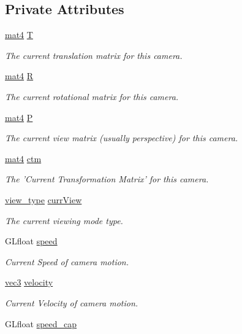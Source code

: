 \subsection*{\-Private \-Attributes}
\begin{DoxyCompactItemize}
\item 
\hyperlink{class_angel_1_1mat4}{mat4} \hyperlink{class_camera_aa4cb92b539c9a9707a12d7025ed889f6}{\-T}
\begin{DoxyCompactList}\small\item\em \-The current translation matrix for this camera. \end{DoxyCompactList}\item 
\hyperlink{class_angel_1_1mat4}{mat4} \hyperlink{class_camera_a8fd028120b18556c43ad86756e637fbc}{\-R}
\begin{DoxyCompactList}\small\item\em \-The current rotational matrix for this camera. \end{DoxyCompactList}\item 
\hyperlink{class_angel_1_1mat4}{mat4} \hyperlink{class_camera_a0bee6fbae6ec5960850a5fb858f3912a}{\-P}
\begin{DoxyCompactList}\small\item\em \-The current view matrix (usually perspective) for this camera. \end{DoxyCompactList}\item 
\hyperlink{class_angel_1_1mat4}{mat4} \hyperlink{class_camera_a9b1e81e3f5531390bb6a599dca0d2444}{ctm}
\begin{DoxyCompactList}\small\item\em \-The '\-Current \-Transformation \-Matrix' for this camera. \end{DoxyCompactList}\item 
\hyperlink{class_camera_afdccec6d447490dcc80ab6b99f21d0e5}{view\-\_\-type} \hyperlink{class_camera_a1fe2ef68d26bb98f0aa736948304eb64}{curr\-View}
\begin{DoxyCompactList}\small\item\em \-The current viewing mode type. \end{DoxyCompactList}\item 
\-G\-Lfloat \hyperlink{class_camera_a308e92b5d3ef0eea5cac7745df6e28f4}{speed}
\begin{DoxyCompactList}\small\item\em \-Current \-Speed of camera motion. \end{DoxyCompactList}\item 
\hyperlink{struct_angel_1_1vec3}{vec3} \hyperlink{class_camera_a5b95c890f213db50f321380108b17ea1}{velocity}
\begin{DoxyCompactList}\small\item\em \-Current \-Velocity of camera motion. \end{DoxyCompactList}\item 
\hypertarget{class_camera_aa075ae6872228fc4db892533d9f6d881}{\-G\-Lfloat \hyperlink{class_camera_aa075ae6872228fc4db892533d9f6d881}{speed\-\_\-cap}}\label{class_camera_aa075ae6872228fc4db892533d9f6d881}


\end{DoxyCompactItemize}
